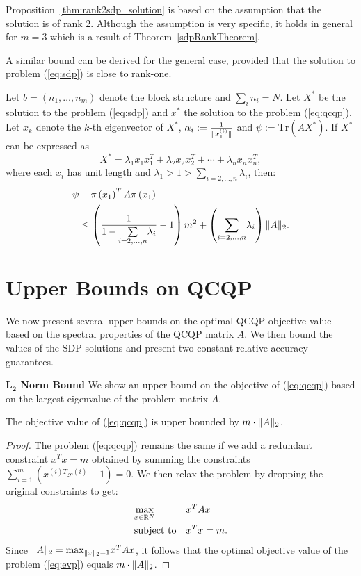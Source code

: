 \begin{remark}
Proposition~\ref{thm:rank2sdp_solution} is based on the assumption that the solution is of rank 2. Although the assumption is very specific, it holds in general
for $m=3$ which is a result of Theorem~\ref{sdpRankTheorem}.
\end{remark}

A similar bound can be derived for the general case, provided that the solution to problem (\ref{eq:sdp}) is close to rank-one.
\begin{proposition}
Let $b = \left(n_1,\ldots,n_m\right)$ denote the block structure and $ \sum_i n_i = N $.
Let $X^*$ be the solution to the problem (\ref{eq:sdp}) and $x^{*}$ the solution to the problem (\ref{eq:qcqp}).
Let $x_k$ denote the $k$-th eigenvector of $X^*$,
$\alpha_i := \frac{1}{\lVert x_1^{(i)}\rVert}$ and
$\psi := \mathrm{Tr}\left(A X^{*}\right)$.
If $X^*$ can be expressed as
$$X^* = \lambda_1  x_1 x_1^T + \lambda_2 x_2 x_2^T + \cdots + \lambda_n x_n x_n^T,$$
where each $x_i$ has unit length and $\lambda_1 > 1 >  \underset{i=2,\ldots, n}{\sum} \lambda_i$,
 then:
\begin{align*}
\psi &- \pi\left(x_1\right)^T A \pi\left(x_1\right) \\ &\leq  \left(\frac{1}{1- \underset{i=2,\ldots, n}{\sum} \lambda_i} -1\right)  m^2 + \left(\underset{i=2,\ldots, n}{\sum} \lambda_i\right) \lVert A\rVert_2.
\end{align*}
\end{proposition}

\section{Upper Bounds on QCQP}\label{chap:relaxations:upperbounds}
We now present several upper bounds on the optimal QCQP objective
value based on the spectral properties of the QCQP matrix $A$. We then bound the
values of the SDP solutions and present two constant relative accuracy
guarantees.

\noindent\textbf{$\mathbf{L_2}$ Norm Bound}
We show an  upper bound on the objective of (\ref{eq:qcqp}) based on the largest eigenvalue
of the problem matrix $A$.

\begin{proposition}
The objective value of (\ref{eq:qcqp}) is upper bounded by $m \cdot \lVert A\rVert_2$.
\end{proposition}
\begin{proof}
The problem (\ref{eq:qcqp}) remains the same if we add a redundant constraint $x^T x = m$
obtained by summing the constraints $\sum_{i= 1}^{m} \left(x^{(i)T}x^{(i)} - 1\right) = 0$.
We then relax the problem by dropping the original constraints to get:
\begin{equation}\label{eq:evp}
\begin{aligned}
& \underset{x \in \mathbb{R}^{N}}{\text{max}}
& & x^T A x\\
& \text{subject to}
& &x^{T} x = m.
\end{aligned}
\end{equation}
Since $\lVert A\rVert_2 = \text{max}_{\lVert x\rVert_2 = 1} x^T A x$, it follows that the optimal
objective value of the problem (\ref{eq:evp}) equals $m \cdot \lVert A\rVert_2 $.
\end{proof}

